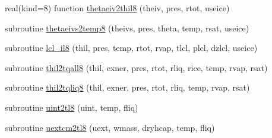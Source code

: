 \begin{DoxyCompactItemize}
\item 
real(kind=8) function \hyperlink{namespacetherm__lib8_aeb2f84da15d0d99455778580d72dbde5}{thetaeiv2thil8} (theiv, pres, rtot, useice)
\item 
subroutine \hyperlink{namespacetherm__lib8_a3a5271057d229a35bd188bd8cff5571b}{thetaeivs2temp8} (theivs, pres, theta, temp, rsat, useice)
\item 
subroutine \hyperlink{namespacetherm__lib8_a0f6906696662a832ed73b03f8f97e449}{lcl\+\_\+il8} (thil, pres, temp, rtot, rvap, tlcl, plcl, dzlcl, useice)
\item 
subroutine \hyperlink{namespacetherm__lib8_ac25af6f3203cd6cbf1e3933ae25eaeca}{thil2tqall8} (thil, exner, pres, rtot, rliq, rice, temp, rvap, rsat)
\item 
subroutine \hyperlink{namespacetherm__lib8_aec7ba278ae89d43e89ab00a29a825416}{thil2tqliq8} (thil, exner, pres, rtot, rliq, temp, rvap, rsat)
\item 
subroutine \hyperlink{namespacetherm__lib8_a25d3d7f68a7ddbdf3c13eac03b1bb780}{uint2tl8} (uint, temp, fliq)
\item 
subroutine \hyperlink{namespacetherm__lib8_af00b031b94385eb06e81a837246715bd}{uextcm2tl8} (uext, wmass, dryhcap, temp, fliq)
\end{DoxyCompactItemize}
